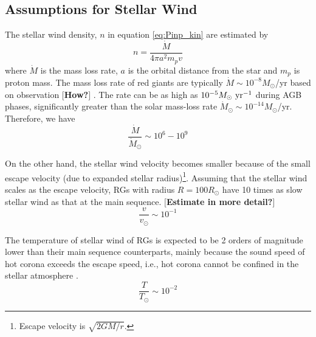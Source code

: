\documentclass{emulateapj}
\def\memoYF#1{\color{red}$[${\bf #1}$]$ \color{black}}
\def\memoDS#1{\color{blue}$[${\bf #1}$]$ \color{black}}
\begin{document}






\subsection{Assumptions for Stellar Wind}
\label{ss:stellarwind}

The stellar wind density, $n$ in equation \ref{eq:Pinp_kin} are estimated by
\begin{equation}
n = \frac{\dot M}{4\pi a^2 m_p v}
\end{equation}
where $\dot M$ is the mass loss rate, $a$ is the orbital distance from the star and $m_p$ is proton mass. 
The mass loss rate of red giants are typically $\dot M \sim 10^{-8} M_{\odot}$/yr based on observation \memoYF{How?}. The rate can be as high as $10^{-5} M_\odot~{\rm yr^{-1}}$ during AGB phases, significantly greater than the solar mass-loss rate $\dot M_{\odot } \sim 10^{-14} M_{\odot}$/yr. 
Therefore, we have
\begin{equation}
\frac{\dot M}{\dot M_{\odot}} \sim 10^6 - 10^9
\end{equation}

On the other hand, the stellar wind velocity becomes smaller because of the small escape velocity (due to expanded stellar radius)\footnote{Escape velocity is $\sqrt{2GM/r}$.}. Assuming that the stellar wind scales as the escape velocity, RGs with radius $R=100R_{\odot}$ have 10 times as slow stellar wind as that at the main sequence. \memoYF{Estimate in more detail?}
\begin{equation}
\frac{v}{v_{\odot}} \sim 10^{-1}
\end{equation}

The temperature of stellar wind of RGs is expected to be 2 orders of magnitude lower than their main sequence counterparts, mainly because the sound speed of hot corona exceeds the escape speed, i.e., hot corona cannot be confined in the stellar atmosphere \citep{suzuki2008}. 
\begin{equation}
\frac{T}{T_{\odot}} \sim 10^{-2}
\end{equation}
\end{document}
